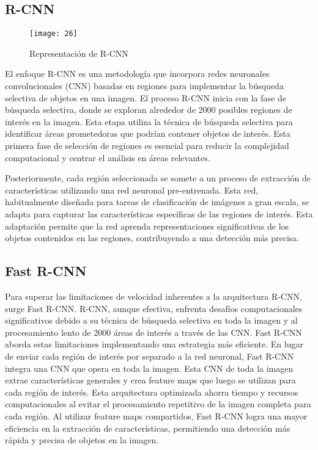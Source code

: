 	\subsection{R-CNN}
	
	\begin{wrapfigure}[19]{R}{.43\textwidth} 
		\centering
		\texttt{[image: 26]}
		\caption{Representación de R-CNN}
	\end{wrapfigure}

	El enfoque R-CNN es una metodología que incorpora redes neuronales convolucionales (CNN) basadas en regiones para implementar la búsqueda selectiva de objetos en una imagen.
El proceso R-CNN inicia con la fase de búsqueda selectiva, donde se exploran alrededor de 2000 posibles regiones de interés en la imagen. Esta etapa utiliza la técnica de búsqueda selectiva para identificar áreas prometedoras que podrían contener objetos de interés. Esta primera fase de selección de regiones es esencial para reducir la complejidad computacional y centrar el análisis en áreas relevantes.

	Posteriormente, cada región seleccionada se somete a un proceso de extracción de características utilizando una red neuronal pre-entrenada. Esta red, habitualmente diseñada para tareas de clasificación de imágenes a gran escala, se adapta para capturar las características específicas de las regiones de interés. Esta adaptación permite que la red aprenda representaciones significativas de los objetos contenidos en las regiones, contribuyendo a una detección más precisa.

	\subsection{Fast R-CNN}
	Para superar las limitaciones de velocidad inherentes a la arquitectura R-CNN, surge Fast R-CNN. R-CNN, aunque efectiva, enfrenta desafíos computacionales significativos debido a su técnica de búsqueda selectiva en toda la imagen y al procesamiento lento de 2000 áreas de interés a través de las CNN.
Fast R-CNN aborda estas limitaciones implementando una estrategia más eficiente. En lugar de enviar cada región de interés por separado a la red neuronal, Fast R-CNN integra una CNN que opera en toda la imagen. Esta CNN de toda la imagen extrae características generales y crea feature maps que luego se utilizan para cada región de interés.
Esta arquitectura optimizada ahorra tiempo y recursos computacionales al evitar el procesamiento repetitivo de la imagen completa para cada región. Al utilizar feature maps compartidos, Fast R-CNN logra una mayor eficiencia en la extracción de características, permitiendo una detección más rápida y precisa de objetos en la imagen.

